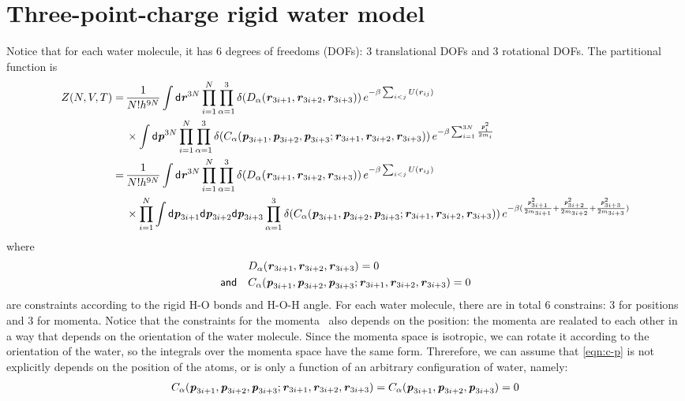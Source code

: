 \documentclass[aip,jcp,a4paper,reprint,onecolumn]{revtex4-1}
\newcommand{\vect}[1]{\textbf{\textit{#1}}}
\newcommand{\dd}[0]{\textsf{d}}
\begin{document}
\section{Three-point-charge rigid water model}

Notice that for each water molecule, it has 6 degrees of freedoms (DOFs):
3 translational DOFs and 3 rotational DOFs. The partitional function is 
\begin{align} \nonumber
  Z(N,V,T)
  =\,&
  \frac{1}{N! h^{9N}}
  \int\dd\vect r^{3N}
  \prod_{i=1}^N\prod_{\alpha=1}^3
  \delta( D_{\alpha}(\vect r_{3i+1},\vect r_{3i+2}, \vect r_{3i+3}))\,
  e^{ -\beta\sum_{i<j} U(\vect r_{ij})}\\\nonumber
  &\times
  \int\dd\vect p^{3N}
  \prod_{i=1}^N\prod_{\alpha=1}^3
  \delta( C_{\alpha}(\vect p_{3i+1},\vect p_{3i+2}, \vect p_{3i+3}; \vect r_{3i+1},\vect r_{3i+2}, \vect r_{3i+3}))\,
  e^{-\beta \sum_{i=1}^{3N}\frac{\vect p_i^2}{2m_i}}\\\nonumber
  =\,&
  \frac{1}{N! h^{9N}}
  \int\dd\vect r^{3N}
  \prod_{i=1}^N\prod_{\alpha=1}^3
  \delta( D_{\alpha}(\vect r_{3i+1},\vect r_{3i+2}, \vect r_{3i+3}))\,
  e^{ -\beta\sum_{i<j} U(\vect r_{ij})}\\
  &\times
  \prod_{i=1}^N
  \int\dd\vect p_{3i+1}\dd\vect p_{3i+2}\dd\vect p_{3i+3}
  \prod_{\alpha=1}^3
  \delta( C_{\alpha}(\vect p_{3i+1},\vect p_{3i+2}, \vect p_{3i+3}; \vect r_{3i+1},\vect r_{3i+2}, \vect r_{3i+3}))\,
  e^{-\beta (\frac{\vect p_{3i+1}^2}{2m_{3i+1}} + \frac{\vect p_{3i+2}^2}{2m_{3i+2}} +
    \frac{\vect p_{3i+3}^2}{2m_{3i+3}} )}
\end{align}
where
\begin{align}\label{eqn:c-r}
  &D_{\alpha}(\vect r_{3i+1},\vect r_{3i+2}, \vect r_{3i+3}) = 0\\\label{eqn:c-p}
  \textsf{and}\quad &C_{\alpha}(\vect p_{3i+1},\vect p_{3i+2}, \vect p_{3i+3}; \vect r_{3i+1},\vect r_{3i+2}, \vect r_{3i+3}) = 0
\end{align}
are constraints according to the rigid H-O bonds and H-O-H angle. For each water molecule,
there are in total 6 constrains: 3 for positions and 3 for momenta.
Notice that the constraints for the momenta~\label{eqn:c-p} also depends
on the position: the momenta are realated to each other
in a way that depends on the orientation of the water molecule.
Since the momenta space is isotropic, we can rotate it according to the
orientation of the water, so the integrals over the momenta space have the same
form. Threrefore, we can assume that \eqref{eqn:c-p} is not explicitly
depends on the position of the atoms, or is only a function of an arbitrary
configuration of water, namely:
\begin{align}
  C_{\alpha}(\vect p_{3i+1},\vect p_{3i+2}, \vect p_{3i+3}; \vect r_{3i+1},\vect r_{3i+2}, \vect r_{3i+3}) = C_{\alpha}(\vect p_{3i+1},\vect p_{3i+2}, \vect p_{3i+3}) = 0
\end{align}
\end{document}
